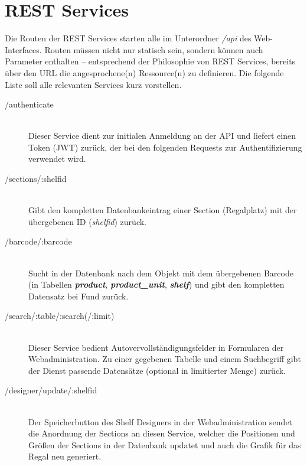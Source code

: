 \section{REST Services}
Die Routen der \acs{REST} Services starten alle im Unterordner \emph{/api} des Web-Interfaces. Routen müssen nicht nur statisch sein, sondern können auch Parameter enthalten -- entsprechend der Philosophie von \acs{REST} Services, bereits über den \acs{URL} die angesprochene(n) Ressource(n) zu definieren. Die folgende Liste soll alle relevanten Services kurz vorstellen.

\begin{description}
  \item[/authenticate] \hfill \\
    Dieser Service dient zur initialen Anmeldung an der \acs{API} und liefert einen Token (\acs{JWT}) zurück, der bei den folgenden Requests zur Authentifizierung verwendet wird.
  \item[/sections/:shelfid] \hfill \\
    Gibt den kompletten Datenbankeintrag einer Section (Regalplatz) mit der übergebenen ID (\emph{shelfid}) zurück.
  \item[/barcode/:barcode] \hfill \\
    Sucht in der Datenbank nach dem Objekt mit dem übergebenen Barcode (in Tabellen \textit{\textbf{product}}, \textit{\textbf{product\_unit}}, \textit{\textbf{shelf}}) und gibt den kompletten Datensatz bei Fund zurück.
  \item[/search/:table/:search(/:limit)] \hfill \\
    Dieser Service bedient Autovervollständigungsfelder in Formularen der Webadministration. Zu einer gegebenen Tabelle und einem Suchbegriff gibt der Dienst passende Datensätze (optional in limitierter Menge) zurück.
  \item[/designer/update/:shelfid] \hfill \\
    Der Speicherbutton des Shelf Designers in der Webadministration sendet die Anordnung der Sections an diesen Service, welcher die Positionen und Größen der Sections in der Datenbank updatet und auch die Grafik für das Regal neu generiert.
\end{description}
